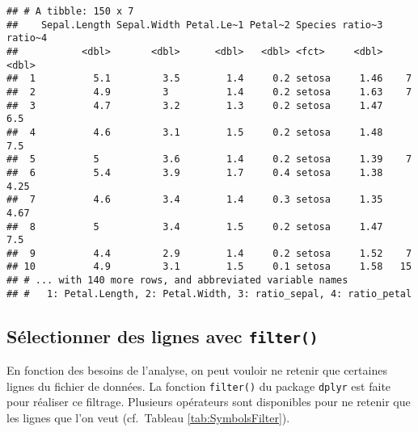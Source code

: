 \documentclass[
  french,
]{book}
\begin{document}
\begin{verbatim}
## # A tibble: 150 x 7
##    Sepal.Length Sepal.Width Petal.Le~1 Petal~2 Species ratio~3 ratio~4
##           <dbl>       <dbl>      <dbl>   <dbl> <fct>     <dbl>   <dbl>
##  1          5.1         3.5        1.4     0.2 setosa     1.46    7   
##  2          4.9         3          1.4     0.2 setosa     1.63    7   
##  3          4.7         3.2        1.3     0.2 setosa     1.47    6.5 
##  4          4.6         3.1        1.5     0.2 setosa     1.48    7.5 
##  5          5           3.6        1.4     0.2 setosa     1.39    7   
##  6          5.4         3.9        1.7     0.4 setosa     1.38    4.25
##  7          4.6         3.4        1.4     0.3 setosa     1.35    4.67
##  8          5           3.4        1.5     0.2 setosa     1.47    7.5 
##  9          4.4         2.9        1.4     0.2 setosa     1.52    7   
## 10          4.9         3.1        1.5     0.1 setosa     1.58   15   
## # ... with 140 more rows, and abbreviated variable names
## #   1: Petal.Length, 2: Petal.Width, 3: ratio_sepal, 4: ratio_petal
\end{verbatim}

\hypertarget{suxe9lectionner-des-lignes-avec-filter}{%
\subsection{\texorpdfstring{Sélectionner des lignes avec \texttt{filter()}}{Sélectionner des lignes avec filter()}}\label{suxe9lectionner-des-lignes-avec-filter}}

En fonction des besoins de l'analyse, on peut vouloir ne retenir que certaines lignes du fichier de données. La fonction \texttt{filter()} du package \texttt{dplyr} est faite pour réaliser ce filtrage. Plusieurs opérateurs sont disponibles pour ne retenir que les lignes que l'on veut (cf.~Tableau \ref{tab:SymbolsFilter}).

\providecommand{\docline}[3]{\noalign{\global\setlength{\arrayrulewidth}{#1}}\arrayrulecolor[HTML]{#2}\cline{#3}}

\setlength{\tabcolsep}{2pt}

\renewcommand*{\arraystretch}{1.5}
\end{document}
